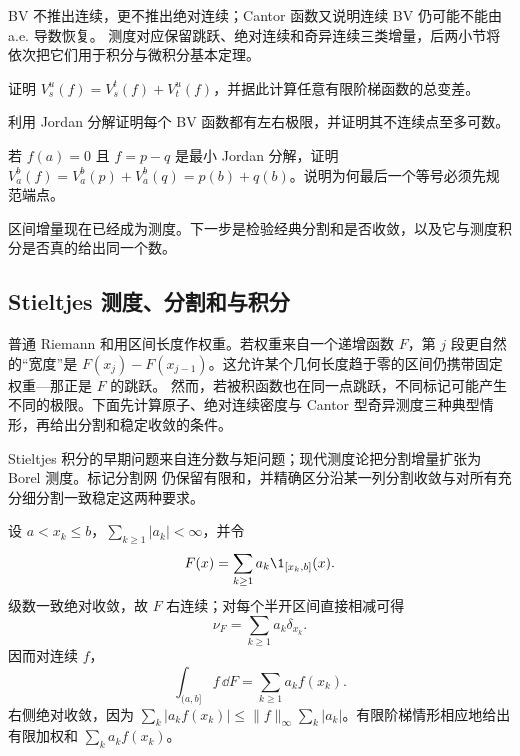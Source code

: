 \begin{remark}
BV 不推出连续，更不推出绝对连续；Cantor 函数又说明连续 BV 仍可能不能由 a.e. 导数恢复。
测度对应保留跳跃、绝对连续和奇异连续三类增量，后两小节将依次把它们用于积分与微积分基本定理。
\end{remark}

\begin{exercise}
证明 $V_s^u(f)=V_s^t(f)+V_t^u(f)$，并据此计算任意有限阶梯函数的总变差。
\end{exercise}
\begin{exercise}
利用 Jordan 分解证明每个 BV 函数都有左右极限，并证明其不连续点至多可数。
\end{exercise}
\begin{exercise}
若 $f(a)=0$ 且 $f=p-q$ 是最小 Jordan 分解，证明
$V_a^b(f)=V_a^b(p)+V_a^b(q)=p(b)+q(b)$。说明为何最后一个等号必须先规范端点。
\end{exercise}
区间增量现在已经成为测度。下一步是检验经典分割和是否收敛，以及它与测度积分是否真的给出同一个数。

\subsection{Stieltjes 测度、分割和与积分}\label{subsec:4-2-2}

普通 Riemann 和用区间长度作权重。若权重来自一个递增函数 $F$，第 $j$ 段更自然的“宽度”是
$F(x_j)-F(x_{j-1})$。这允许某个几何长度趋于零的区间仍携带固定权重---那正是 $F$ 的跳跃。
然而，若被积函数也在同一点跳跃，不同标记可能产生不同的极限。下面先计算原子、绝对连续密度与
Cantor 型奇异测度三种典型情形，再给出分割和稳定收敛的条件。

Stieltjes 积分的早期问题来自连分数与矩问题；现代测度论把分割增量扩张为 Borel 测度。标记分割网
仍保留有限和，并精确区分沿某一列分割收敛与对所有充分细分割一致稳定这两种要求。

\begin{example}[跳跃积分]\label{ex:4-2-2-1}
设 $a<x_k\le b$，$\sum_{k\ge1}|a_k|<\infty$，并令
\[
 F(x)=\sum_{k\ge1}a_k\1_{[x_k,b]}(x).
\]
级数一致绝对收敛，故 $F$ 右连续；对每个半开区间直接相减可得
\[
 \nu_F=\sum_{k\ge1}a_k\delta_{x_k}.
\]
因而对连续 $f$，
\begin{equation}\label{eq:4-2-jump-integral}
 \int_{(a,b]}f\,\dd F=\sum_{k\ge1}a_kf(x_k).
\end{equation}
右侧绝对收敛，因为
$\sum_k|a_kf(x_k)|\le\|f\|_\infty\sum_k|a_k|$。有限阶梯情形相应地给出有限加权和
$\sum_k a_kf(x_k)$。
\end{example}

